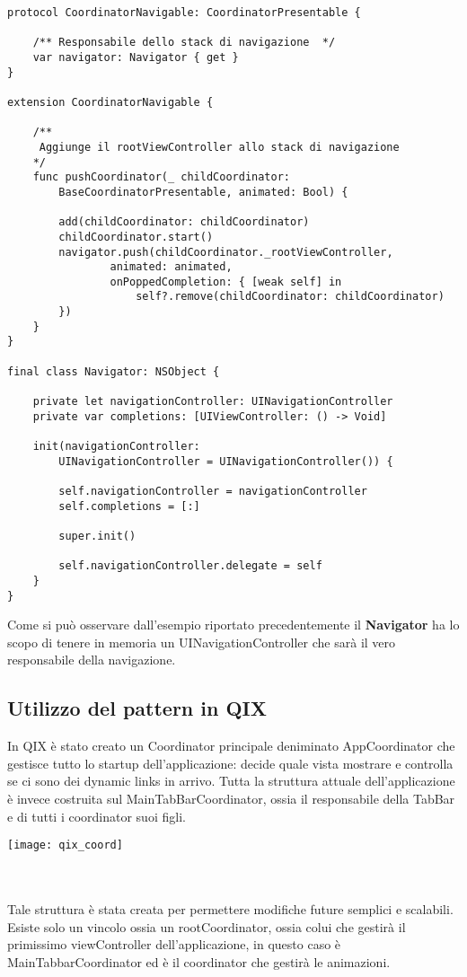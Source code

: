 \begin{verbatim}
protocol CoordinatorNavigable: CoordinatorPresentable {
    
    /** Responsabile dello stack di navigazione  */
    var navigator: Navigator { get }
}

extension CoordinatorNavigable {
    
    /**
     Aggiunge il rootViewController allo stack di navigazione
    */
    func pushCoordinator(_ childCoordinator:
        BaseCoordinatorPresentable, animated: Bool) {

        add(childCoordinator: childCoordinator)
        childCoordinator.start()
        navigator.push(childCoordinator._rootViewController,
                animated: animated,
                onPoppedCompletion: { [weak self] in
                    self?.remove(childCoordinator: childCoordinator)
        })
    }
}

final class Navigator: NSObject {

    private let navigationController: UINavigationController
    private var completions: [UIViewController: () -> Void]
    
    init(navigationController:
        UINavigationController = UINavigationController()) {
            
        self.navigationController = navigationController
        self.completions = [:]
        
        super.init()
        
        self.navigationController.delegate = self
    }
}
\end{verbatim}

Come si può osservare dall'esempio riportato precedentemente il \textbf{Navigator}
ha lo scopo di tenere in memoria un UINavigationController che sarà il vero 
responsabile della navigazione.

\subsection{Utilizzo del pattern in QIX}

In QIX è stato creato un Coordinator principale deniminato AppCoordinator che gestisce
tutto lo startup dell'applicazione: decide quale vista mostrare e controlla se ci sono dei dynamic links in arrivo.
Tutta la struttura attuale dell'applicazione è invece costruita sul MainTabBarCoordinator, ossia il responsabile
della TabBar e di tutti i coordinator suoi figli.\\

\begin{minipage}{\linewidth}
    \centering
    \texttt{[image: qix\_coord]}
    \label{fig:8}
\end{minipage}\\ \\

Tale struttura è stata creata per permettere modifiche future semplici e scalabili.
Esiste solo un vincolo ossia un rootCoordinator, ossia colui che gestirà il primissimo viewController dell'applicazione, in questo caso è MainTabbarCoordinator ed è il
coordinator che gestirà le animazioni.